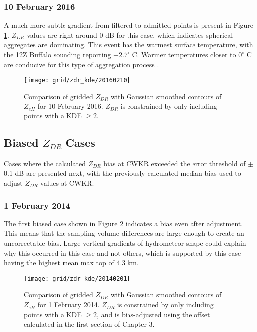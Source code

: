 \subsubsection{10 February 2016}
A much more subtle gradient from filtered to admitted points is present in Figure \ref{fig:grid_zdr_kde_20160210}. $Z_{DR}$ values are right around 0 dB for this case, which indicates spherical aggregates are dominating. This event has the warmest surface temperature, with the 12Z Buffalo sounding reporting $-2.7^{\circ}$ C. Warmer temperatures closer to $0^{\circ}$ C are conducive for this type of aggregation process \citep{Hosler1957}. 
\begin{figure}[H]
\texttt{[image: grid/zdr\_kde/20160210]}
\caption{Comparison of gridded $Z_{DR}$ with Gaussian smoothed contours of $Z_{eH}$ for 10 February 2016. $Z_{DR}$ is constrained by only including points with a
KDE $\geq 2$.} 
\label{fig:grid_zdr_kde_20160210}
\end{figure}

\subsection{Biased $Z_{DR}$ Cases}
Cases where the calculated $Z_{DR}$ bias at CWKR exceeded the error threshold of $\pm$ 0.1 dB are presented next, with the previously calculated median bias used to adjust $Z_{DR}$ values at CWKR.
\subsubsection{1 February 2014}
The first biased case shown in Figure \ref{fig:grid_zdr_kde_20140201} indicates a bias even after adjustment. This means that the sampling volume differences are large enough to create an uncorrectable bias. Large vertical gradients of hydrometeor shape could explain why this occurred in this case and not others, which is supported by this case having the highest mean max top of 4.3 km. 
\begin{figure}[H]
\texttt{[image: grid/zdr\_kde/20140201]}
\caption{Comparison of gridded $Z_{DR}$ with Gaussian smoothed contours of $Z_{eH}$ for 1 February 2014. $Z_{DR}$ is constrained by only including points with a
KDE $\geq 2$, and is bias-adjusted using the offset calculated in the first section of Chapter 3.} 
\label{fig:grid_zdr_kde_20140201}
\end{figure}

